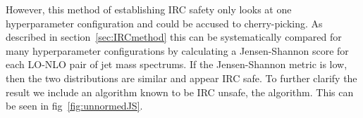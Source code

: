 \begin{figure}[htp]
\end{figure}    

%
%
However, this method of establishing IRC safety only looks at one hyperparameter configuration and could be accused to cherry-picking.
As described in section~\ref{sec:IRCmethod} this can be systematically compared for many hyperparameter configurations by calculating a Jensen-Shannon
score for each LO-NLO pair of jet mass spectrums.
If the Jensen-Shannon metric is low, then the two distributions are similar and appear IRC safe.
To further clarify the result we include an algorithm known to be IRC unsafe, the \itercone{} algorithm.
This can be seen in fig~\ref{fig:unnormedJS}.

